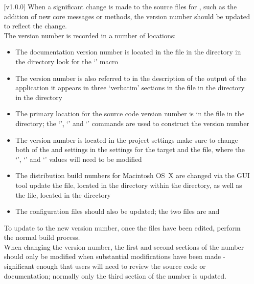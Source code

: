 [v1.0.0]
When a significant change is made to the source files for \mplusm, such as the addition of
new core messages or methods, the version number should be updated to reflect the
change.\\

The version number is recorded in a number of locations:
\begin{itemize}
\item The documentation version number is located in the  file
in the  directory in the  directory
\longDash{} look for the `' macro
\item\exSp{} The version number is also referred to in the description of the output of
the  application \longDash{} it appears in three `verbatim'
sections in the  file in the  directory in
the  directory
\item\exSp{} The primary location for the source code version number is in the
 file in the  directory; the
`', `'
and `' commands are used to construct the version
number
\item\exSp{} The \emph{\MMMU} version number is located in the  project
settings \longDash{} make sure to change both of the  and 
settings in the  settings for the \asCode{\MMMU} target \longDash{} and
the  file, where the `', `'
and `' values will need to be modified
\item\exSp{} The distribution build numbers for Macintosh OS~X are changed via the
 GUI tool \longDash{} update the  file, located in the
 directory within the 
directory, as well as the  file, located in the
 directory
\item\exSp{} The  configuration files should also be updated; the two
files are  and
\end{itemize}
To update to the new version number, once the files have been edited, perform the normal
build process.\\

When changing the version number, the first and second sections of the number should only
be modified when substantial modifications have been made - significant enough that users
will need to review the source code or documentation; normally only the third section of
the number is updated.
\appendixEnd{}



